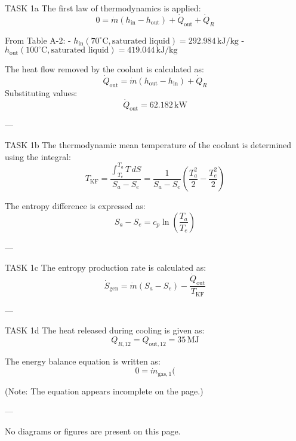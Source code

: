 TASK 1a  
The first law of thermodynamics is applied:  
\[
0 = \dot{m}(h_{\text{in}} - h_{\text{out}}) + \dot{Q}_{\text{out}} + \dot{Q}_R
\]  

From Table A-2:  
- \( h_{\text{in}}(70^\circ\text{C}, \text{saturated liquid}) = 292.984 \, \text{kJ/kg} \)  
- \( h_{\text{out}}(100^\circ\text{C}, \text{saturated liquid}) = 419.044 \, \text{kJ/kg} \)  

The heat flow removed by the coolant is calculated as:  
\[
\dot{Q}_{\text{out}} = \dot{m}(h_{\text{out}} - h_{\text{in}}) + \dot{Q}_R
\]  
Substituting values:  
\[
\dot{Q}_{\text{out}} = 62.182 \, \text{kW}
\]  

---

TASK 1b  
The thermodynamic mean temperature of the coolant is determined using the integral:  
\[
T_{\text{KF}} = \frac{\int_{T_e}^{T_a} T \, dS}{S_a - S_e} = \frac{1}{S_a - S_e} \left( \frac{T_a^2}{2} - \frac{T_e^2}{2} \right)
\]  

The entropy difference is expressed as:  
\[
S_a - S_e = c_p \ln\left(\frac{T_a}{T_e}\right)
\]  

---

TASK 1c  
The entropy production rate is calculated as:  
\[
\dot{S}_{\text{gen}} = \dot{m}(S_a - S_e) - \frac{\dot{Q}_{\text{out}}}{T_{\text{KF}}}
\]  

---

TASK 1d  
The heat released during cooling is given as:  
\[
Q_{R,12} = Q_{\text{out},12} = 35 \, \text{MJ}
\]  

The energy balance equation is written as:  
\[
0 = \dot{m}_{\text{gas},1}(
\]  

(Note: The equation appears incomplete on the page.)  

---

No diagrams or figures are present on this page.